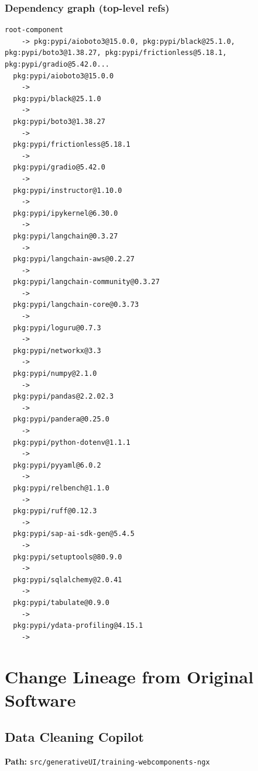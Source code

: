 \documentclass[11pt,a4paper]{article}
\begin{document}
\subsubsection*{Dependency graph (top-level refs)}
\begin{lstlisting}[style=depgraph]
  root-component
    -> pkg:pypi/aioboto3@15.0.0, pkg:pypi/black@25.1.0, pkg:pypi/boto3@1.38.27, pkg:pypi/frictionless@5.18.1, pkg:pypi/gradio@5.42.0...
  pkg:pypi/aioboto3@15.0.0
    -> 
  pkg:pypi/black@25.1.0
    -> 
  pkg:pypi/boto3@1.38.27
    -> 
  pkg:pypi/frictionless@5.18.1
    -> 
  pkg:pypi/gradio@5.42.0
    -> 
  pkg:pypi/instructor@1.10.0
    -> 
  pkg:pypi/ipykernel@6.30.0
    -> 
  pkg:pypi/langchain@0.3.27
    -> 
  pkg:pypi/langchain-aws@0.2.27
    -> 
  pkg:pypi/langchain-community@0.3.27
    -> 
  pkg:pypi/langchain-core@0.3.73
    -> 
  pkg:pypi/loguru@0.7.3
    -> 
  pkg:pypi/networkx@3.3
    -> 
  pkg:pypi/numpy@2.1.0
    -> 
  pkg:pypi/pandas@2.2.02.3
    -> 
  pkg:pypi/pandera@0.25.0
    -> 
  pkg:pypi/python-dotenv@1.1.1
    -> 
  pkg:pypi/pyyaml@6.0.2
    -> 
  pkg:pypi/relbench@1.1.0
    -> 
  pkg:pypi/ruff@0.12.3
    -> 
  pkg:pypi/sap-ai-sdk-gen@5.4.5
    -> 
  pkg:pypi/setuptools@80.9.0
    -> 
  pkg:pypi/sqlalchemy@2.0.41
    -> 
  pkg:pypi/tabulate@0.9.0
    -> 
  pkg:pypi/ydata-profiling@4.15.1
    -> 
\end{lstlisting}

\newpage
\section{Change Lineage from Original Software}

\subsection{Data Cleaning Copilot}
\textbf{Path:} \texttt{src/generativeUI/training-webcomponents-ngx}
\end{document}
